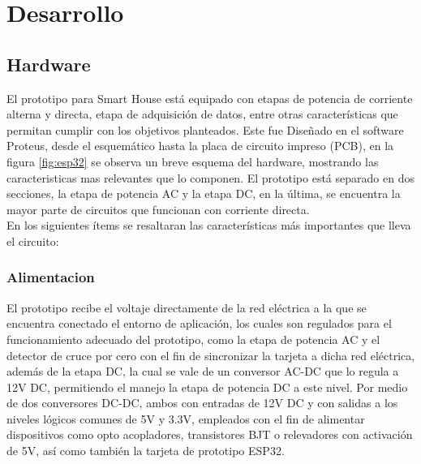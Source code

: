 \section{Desarrollo}
\subsection{Hardware}\label{sec:hw}

El prototipo para Smart House está equipado con etapas de potencia de corriente alterna y directa, etapa de adquisición de datos, entre otras características que permitan cumplir con los objetivos planteados. Este fue Diseñado en el software Proteus, desde el esquemático hasta la placa de circuito impreso (PCB), en la figura \ref{fig:esp32} se observa un breve esquema del hardware, mostrando las caracteristicas mas relevantes que lo componen. El prototipo está separado en dos secciones, la etapa de potencia AC y la etapa DC, en la última, se encuentra la mayor parte de circuitos que funcionan con corriente directa.\\


En los siguientes ítems se resaltaran las características más importantes que lleva el circuito:\\

	\subsubsection{Alimentacion}
	
	El prototipo recibe el voltaje directamente de la red eléctrica a la que se encuentra conectado el entorno de aplicación, los cuales son regulados para el funcionamiento adecuado del prototipo, como la etapa de potencia AC y el detector de cruce por cero con el fin de sincronizar la tarjeta a dicha red eléctrica, además de la etapa DC, la cual se vale de un conversor AC-DC que lo regula a 12V DC, permitiendo el manejo la etapa de potencia DC a este nivel.  Por medio de dos conversores DC-DC, ambos con entradas de 12V DC y con salidas a los niveles lógicos comunes de 5V y 3.3V, empleados con el fin de alimentar dispositivos como opto acopladores, transistores BJT o relevadores con activación de 5V, así como también la tarjeta de prototipo ESP32.\\
			
